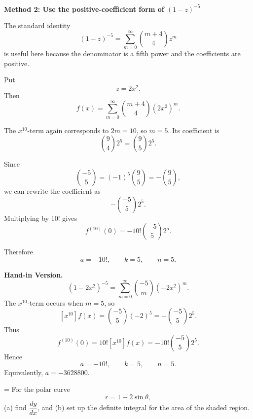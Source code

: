 \documentclass[a4paper,12pt,twocolumn]{article}
\newlength{\problemnumberwidth}
\newenvironment{solutionbox}{\begin{framed}}{\end{framed}}
\newcommand{\problem}[3]{%
  \Needspace{10\baselineskip}%
  \phantomsection\label{#1}%
  \par\vspace{0.8em}%
  \noindent
  \hangindent=\problemnumberwidth
  \hangafter=1
  \makebox[\problemnumberwidth][l]{\textbf{#2.}}#3\par
}
\begin{document}
\begin{solutionbox}
\textbf{Method 2: Use the positive-coefficient form of \((1-z)^{-5}\)}

\begin{steps}
\item The standard identity
\[
(1-z)^{-5}=\sum_{m=0}^{\infty}\binom{m+4}{4}z^m
\]
is useful here because the denominator is a fifth power and the coefficients are positive.

\item Put
\[
z=2x^2.
\]
Then
\[
f(x)=\sum_{m=0}^{\infty}\binom{m+4}{4}(2x^2)^m.
\]

\item The \(x^{10}\)-term again corresponds to \(2m=10\), so \(m=5\). Its coefficient is
\[
\binom{9}{4}2^5=\binom{9}{5}2^5.
\]

\item Since
\[
\binom{-5}{5}=(-1)^5\binom{9}{5}=-\binom{9}{5},
\]
we can rewrite the coefficient as
\[
-\binom{-5}{5}2^5.
\]
Multiplying by \(10!\) gives
\[
f^{(10)}(0)=-10!\binom{-5}{5}2^5.
\]

\item Therefore
\[
a=-10!,\qquad k=5,\qquad n=5.
\]
\end{steps}

\textbf{Hand-in Version.}
\[
(1-2x^2)^{-5}
=\sum_{m=0}^{\infty}\binom{-5}{m}(-2x^2)^m.
\]
The \(x^{10}\)-term occurs when \(m=5\), so
\[
[x^{10}]f(x)=\binom{-5}{5}(-2)^5
=-\binom{-5}{5}2^5.
\]
Thus
\[
f^{(10)}(0)=10![x^{10}]f(x)
=-10!\binom{-5}{5}2^5.
\]
Hence
\[
\boxed{a=-10!,\qquad k=5,\qquad n=5.}
\]
Equivalently, \(a=-3628800\).
\end{solutionbox}

\problem{prob:9}{9}{For the polar curve
\[
r=1-2\sin\theta,
\]
(a) find \(\dfrac{dy}{dx}\), and (b) set up the definite integral for the area of the shaded region.}
\end{document}
